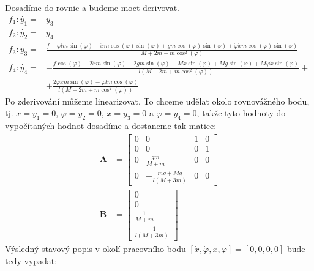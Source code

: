 \documentclass[a4paper, 12pt]{article}
\begin{document}
			Dosadíme do rovnic a budeme moct derivovat.
			\begin{align*}
				f_1: \dot{y_1} = &y_3\\
				f_2: \dot{y_2} = &y_4\\
				f_3: \dot{y_3} = &\frac{f-\dot{\varphi}lm\sin(\varphi)-\dot{x}m\cos(\varphi)\sin(\varphi)+gm\cos(\varphi)\sin(\varphi)+\dot{\varphi}\dot{x}m\cos(\varphi)\sin(\varphi)}{M+2m-m\cos^2(\varphi)}\\
				f_4: \dot{y_4} = &-\frac{f\cos(\varphi)-2\dot{x}m\sin(\varphi)+2gm\sin(\varphi)-M\dot{x}\sin(\varphi)+Mg\sin(\varphi)+M\dot{\varphi}\dot{x}\sin(\varphi)}{l(M+2m+m\cos^2(\varphi))}+\\&+\frac{2\dot{\varphi}\dot{x}m\sin(\varphi)-\dot{\varphi}lm\cos(\varphi)}{l(M+2m+m\cos^2(\varphi))}
			\end{align*}
			Po zderivování můžeme linearizovat. To chceme udělat okolo rovnovážného bodu, tj. $x = y_1 = 0$, $\varphi = y_2 = 0$, $\dot{x} = y_3 = 0$ a $\dot{\varphi} = y_4 = 0$, takže tyto hodnoty do vypočítaných hodnot dosadíme a dostaneme tak matice:
			\begin{align*}
				\mathbf{A} &= \left[\begin{matrix}
					0 & 0 & 1 & 0\\
					0 & 0 & 0 & 1\\
					0 & \frac{gm}{M+m} & 0 & 0\\
					0 & -\frac{mg+Mg}{l\left(M+3m\right)} & 0 & 0
				\end{matrix}\right]\\
				\mathbf{B} &= \left[\begin{matrix}
					0\\
					0\\
					\frac{1}{M+m}\\
					\frac{-1}{l\left(M+3m\right)}
				\end{matrix}\right]
			\end{align*}
			Výsledný stavový popis v okolí pracovního bodu $\left[\dot{x}, \dot{\varphi}, x, \varphi\right]=\left[0, 0, 0, 0\right]$ bude tedy vypadat:
\end{document}

